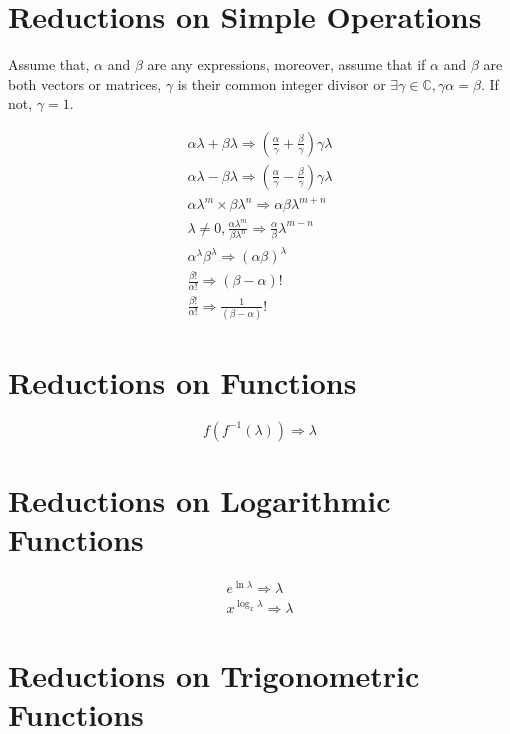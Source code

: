 \documentclass[11pt,a4paper]{book}
\begin{document}
\section{Reductions on Simple Operations}

Assume that, $\alpha$ and $\beta$ are any expressions, moreover, assume that if $\alpha$ and $\beta$ are both vectors or matrices, $\gamma$ is their common integer divisor or $\exists \gamma \in \mathbb{C}, \gamma\alpha = \beta$. If not, $\gamma = 1$.

\begin{eqnarray}
\alpha\lambda + \beta\lambda \Rightarrow \left( \frac{\alpha}{\gamma} + \frac{\beta}{\gamma}\right)\gamma\lambda \\
\alpha\lambda - \beta\lambda \Rightarrow \left( \frac{\alpha}{\gamma} - \frac{\beta}{\gamma}\right) \gamma\lambda \\
\alpha\lambda^m \times \beta\lambda^n \Rightarrow  \alpha\beta\lambda^{m + n} \\
\lambda \neq 0, \frac{\alpha\lambda^{m}}{\beta\lambda^{n}} \Rightarrow \frac{ \alpha}{\beta}\lambda^{m - n} \\
\alpha^{\lambda}\beta^{\lambda} \Rightarrow \left(\alpha\beta\right)^\lambda\\
\frac{\beta!}{\alpha!} \Rightarrow \left(\beta - \alpha\right)! \\
\frac{\beta!}{\alpha!} \Rightarrow \frac{1}{\left(\beta - \alpha\right)}!
\end{eqnarray}

\section{Reductions on Functions}

\begin{equation}
f(f^{-1}(\lambda)) \Rightarrow \lambda
\end{equation}

\section{Reductions on Logarithmic Functions}

\begin{eqnarray}
e^{\ln\lambda} \Rightarrow \lambda \\
x^{\log_x\lambda} \Rightarrow \lambda
\end{eqnarray}

\section{Reductions on Trigonometric Functions}
\end{document}
